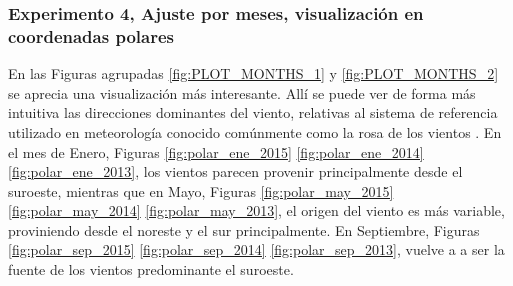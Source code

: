 \subsubsection{Experimento 4, Ajuste por meses, visualización en coordenadas polares}
En las Figuras agrupadas \ref{fig:PLOT_MONTHS_1} y \ref{fig:PLOT_MONTHS_2} se aprecia una visualización más interesante. Allí se puede ver de forma más intuitiva las direcciones dominantes del viento, relativas al sistema de referencia utilizado en meteorología conocido comúnmente como la rosa de los vientos \cite{RosaViento}. En el mes de Enero, Figuras \ref{fig:polar_ene_2015} \ref{fig:polar_ene_2014} \ref{fig:polar_ene_2013}, los vientos parecen provenir principalmente desde el suroeste, mientras que en Mayo, Figuras \ref{fig:polar_may_2015} \ref{fig:polar_may_2014} \ref{fig:polar_may_2013}, el origen del viento es más variable, proviniendo desde el noreste y el sur principalmente. En Septiembre, Figuras \ref{fig:polar_sep_2015} \ref{fig:polar_sep_2014} \ref{fig:polar_sep_2013}, vuelve a a ser la fuente de los vientos predominante el suroeste.
